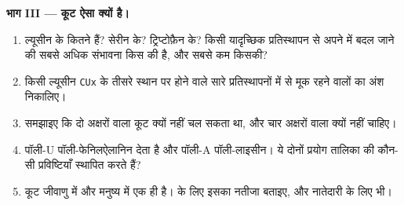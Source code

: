 \begin{problem}
\medskip
\noindent\textbf{भाग III --- कूट ऐसा क्यों है।}
\begin{enumerate}[resume]
  \item ल्यूसीन के कितने  हैं? सेरीन के? ट्रिप्टोफ़ैन के? किसी
        यादृच्छिक प्रतिस्थापन से अपने  में बदल जाने की सबसे अधिक
        संभावना किस  की है, और सबसे कम किसकी?
  \item किसी ल्यूसीन  \texttt{CUx} के तीसरे स्थान पर होने वाले सारे
        प्रतिस्थापनों में से मूक रहने वालों का अंश निकालिए।
  \item समझाइए कि दो अक्षरों वाला कूट क्यों नहीं चल सकता था, और चार
        अक्षरों वाला क्यों नहीं चाहिए।
  \item पॉली-U पॉली-फेनिलऐलानिन देता है और पॉली-A पॉली-लाइसीन। ये दोनों
        प्रयोग तालिका की कौन-सी प्रविष्टियाँ स्थापित करते हैं?
  \item कूट जीवाणु में और मनुष्य में एक ही है।  के लिए इसका नतीजा
        बताइए, और नातेदारी के लिए भी।
\end{enumerate}


\end{problem}
